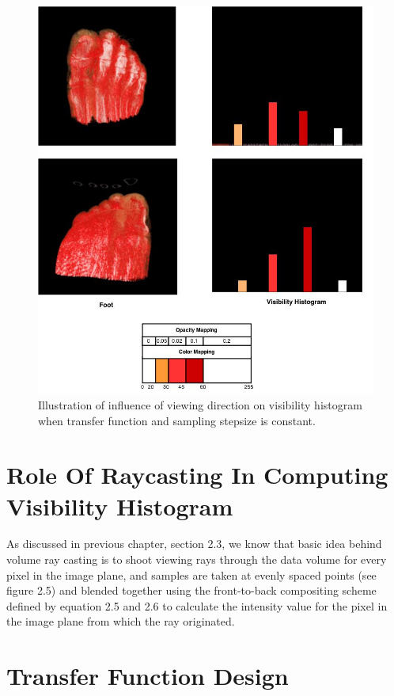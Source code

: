 \begin{figure}
\centering
\includegraphics[width=450pt]{Images/tf_view_influence.jpg}
\caption{ Illustration of influence of viewing direction on visibility histogram when transfer function and sampling stepsize is constant. }
\end{figure}


\section{Role Of Raycasting In Computing Visibility Histogram}

As discussed in previous chapter, section 2.3, we know that basic idea behind volume ray casting is to shoot viewing rays through the data
volume for every pixel in the image plane, and samples are taken at evenly spaced points (see figure 2.5) and blended together using the front-to-back compositing scheme defined by equation 2.5 and 2.6 to calculate the intensity value for the pixel in the image plane from which the ray originated.

\newpage
\section{Transfer Function Design}

